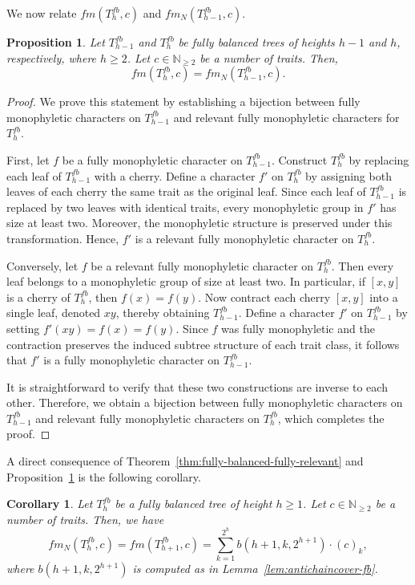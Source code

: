 \documentclass{amsart}
\newtheorem{proposition}[theorem]{Proposition}
\newtheorem{corollary}[theorem]{Corollary}
\theoremstyle{definition}
\begin{document}
We now relate $fm(T_{h}^{fb},c)$ and $fm_N(T_{h-1}^{fb},c)$.

\begin{proposition} \label{prop:fb-fully-counts}
    Let $T_{h-1}^{fb}$ and $T_{h}^{fb}$ be fully balanced trees of heights $h-1$ and $h$, respectively, where $h \geq 2$. Let $c \in \mathbb{N}_{\geq 2}$ be a number of traits. Then,
    \[ fm(T_{h}^{fb},c) = fm_N(T_{h-1}^{fb},c).\]
\end{proposition}


\begin{proof}
    We prove this statement by establishing a bijection between fully monophyletic characters on $T_{h-1}^{fb}$ and relevant fully monophyletic characters for $T_{h}^{fb}$. 

    First, let $f$ be a fully monophyletic character on $T_{h-1}^{fb}$. Construct $T_h^{fb}$ by replacing each leaf of $T_{h-1}^{fb}$ with a cherry. Define a character $f'$ on $T_h^{fb}$ by assigning both leaves of each cherry the same trait as the original leaf. Since each leaf of $T_{h-1}^{fb}$ is replaced by two leaves with identical traits, every monophyletic group in $f'$ has size at least two. Moreover, the monophyletic structure is preserved under this transformation. Hence, $f'$ is a relevant fully monophyletic character on $T_h^{fb}$.

    Conversely, let $f$ be a relevant fully monophyletic character on $T_h^{fb}$. Then every leaf belongs to a monophyletic group of size at least two. In particular, if $[x,y]$ is a cherry of $T_h^{fb}$, then $f(x)=f(y)$. Now contract each cherry $[x,y]$ into a single leaf, denoted $xy$, thereby obtaining $T_{h-1}^{fb}$. Define a character $f'$ on $T_{h-1}^{fb}$ by setting $f'(xy)=f(x)=f(y)$. Since $f$ was fully monophyletic and the contraction preserves the induced subtree structure of each trait class, it follows that $f'$ is a fully monophyletic character on $T_{h-1}^{fb}$.

    It is straightforward to verify that these two constructions are inverse to each other. Therefore, we obtain a bijection between fully monophyletic characters on $T_{h-1}^{fb}$ and relevant fully monophyletic characters on $T_h^{fb}$, which completes the proof.
\end{proof}


A direct consequence of Theorem~\ref{thm:fully-balanced-fully-relevant} and Proposition~\ref{prop:fb-fully-counts} is the following corollary.

\begin{corollary}
    Let $T_h^{fb}$ be a fully balanced tree of height $h \geq 1$. Let $c \in \mathbb{N}_{\geq 2}$ be a number of traits. Then, we have
    \[ fm_N(T_h^{fb},c) = fm(T_{h+1}^{fb},c) = \sum\limits_{k=1}^{2^{h}} b(h+1,k,2^{h+1}) \cdot (c)_k,\]
    where $b(h+1,k,2^{h+1})$ is computed as in Lemma~\ref{lem:antichaincover-fb}.  
\end{corollary}
\end{document}
